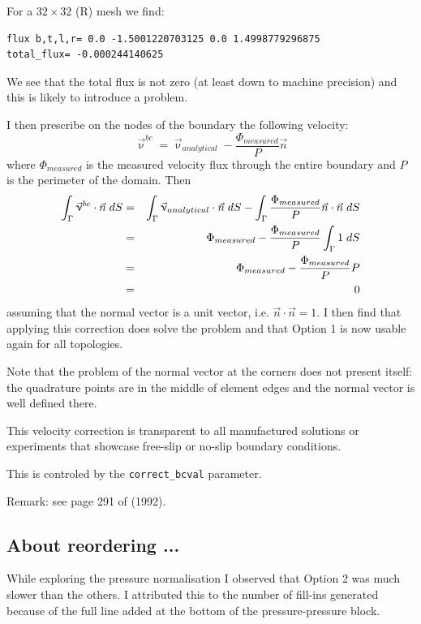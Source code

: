 For a $32\times 32$ (R) mesh we find:
\begin{verbatim}
flux b,t,l,r= 0.0 -1.5001220703125 0.0 1.4998779296875
total_flux= -0.000244140625
\end{verbatim}
We see that the total flux is not zero (at least down to machine precision)
and this is likely to introduce a problem.

I then prescribe on the nodes of the boundary the following velocity:
\[
\vec{\upnu}^{bc} = \vec{\upnu}_{analytical} - \frac{\Phi_{measured}}{P} \vec{n}
\]
where $\Phi_{measured}$ is the measured velocity flux 
through the entire boundary and $P$ is the perimeter of the domain.
Then 
\begin{eqnarray}
\int_\Gamma \vec{\upnu}^{bc} \cdot \vec{n} \; dS
&=& \int_\Gamma \vec{\upnu}_{analytical} \cdot \vec{n} \; dS
- \int_\Gamma  \frac{\Phi_{measured}}{P} \vec{n} \cdot \vec{n} \; dS\nonumber\\
&=& \Phi_{measured} - \frac{\Phi_{measured}}{P} \int_\Gamma  1 \; dS \nonumber\\
&=& \Phi_{measured} - \frac{\Phi_{measured}}{P} P \nonumber\\
&=&0 \nonumber
\end{eqnarray}
assuming that the normal vector is a unit vector, i.e. $\vec{n}\cdot \vec{n}=1$.
I then find that applying this correction does solve the problem 
and that Option 1 is now usable again for all topologies.

Note that the problem of the normal vector at the corners does not
present itself: the quadrature points are in the middle 
of element edges and the normal vector is well defined there.

This velocity correction is transparent to all 
manufactured solutions or experiments that 
showcase free-slip or no-slip boundary conditions.

This is controled by the {\tt correct\_bcval} parameter. 

Remark: see page 291 of \textcite{vibo92} (1992).

\subsection*{About reordering ...}

While exploring the pressure normalisation I observed that 
Option 2 was much slower than the others. I attributed this 
to the number of fill-ins generated because of the full line
added at the bottom of the pressure-pressure block. 

